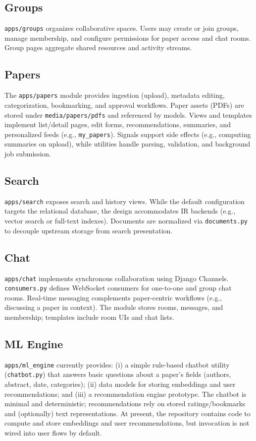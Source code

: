 \documentclass[conference]{IEEEtran}
\begin{document}
\subsection{Groups}
\texttt{apps/groups} organizes collaborative spaces. Users may create or join groups, manage membership, and configure permissions for paper access and chat rooms. Group pages aggregate shared resources and activity streams.

\subsection{Papers}
The \texttt{apps/papers} module provides ingestion (upload), metadata editing, categorization, bookmarking, and approval workflows. Paper assets (PDFs) are stored under \texttt{media/papers/pdfs} and referenced by models. Views and templates implement list/detail pages, edit forms, recommendations, summaries, and personalized feeds (e.g., \texttt{my\_papers}). Signals support side effects (e.g., computing summaries on upload), while utilities handle parsing, validation, and background job submission.

\subsection{Search}
\texttt{apps/search} exposes search and history views. While the default configuration targets the relational database, the design accommodates IR backends (e.g., vector search or full-text indexes). Documents are normalized via \texttt{documents.py} to decouple upstream storage from search presentation.

\subsection{Chat}
\texttt{apps/chat} implements synchronous collaboration using Django Channels. \texttt{consumers.py} defines WebSocket consumers for one-to-one and group chat rooms. Real-time messaging complements paper-centric workflows (e.g., discussing a paper in context). The module stores rooms, messages, and membership; templates include room UIs and chat lists.

\subsection{ML Engine}
\texttt{apps/ml\_engine} currently provides: (i) a simple rule-based chatbot utility (\texttt{chatbot.py}) that answers basic questions about a paper's fields (authors, abstract, date, categories); (ii) data models for storing embeddings and user recommendations; and (iii) a recommendation engine prototype. The chatbot is minimal and deterministic; recommendations rely on stored ratings/bookmarks and (optionally) text representations. At present, the repository contains code to compute and store embeddings and user recommendations, but invocation is not wired into user flows by default.
\end{document}
